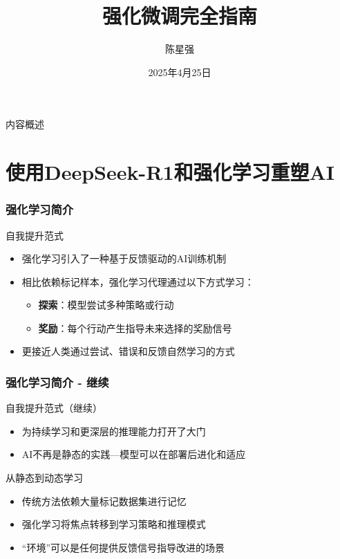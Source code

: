 \documentclass[aspectratio=169]{beamer}
\title[强化微调指南 2025]{强化微调完全指南}
\author{陈星强}
\institute[亿铸智能]{
	亿铸智能
    \\
	中国杭州
}
\date[2025-04-25]{2025年4月25日}
\begin{document}
\begin{frame}
	\maketitle
\end{frame}

\begin{frame}[label=inhalt]{内容概述}
	\tableofcontents
\end{frame}

\section{使用DeepSeek-R1和强化学习重塑AI}

\begin{frame}
	\frametitle{强化学习简介}
	\begin{block}{自我提升范式}
		\begin{itemize}
			\item 强化学习引入了一种基于反馈驱动的AI训练机制
			\item 相比依赖标记样本，强化学习代理通过以下方式学习：
			\begin{itemize}
				\item \textbf{探索}：模型尝试多种策略或行动
				\item \textbf{奖励}：每个行动产生指导未来选择的奖励信号
			\end{itemize}
			\item 更接近人类通过尝试、错误和反馈自然学习的方式
		\end{itemize}
	\end{block}
\end{frame}

\begin{frame}
	\frametitle{强化学习简介 - 继续}
	\begin{block}{自我提升范式（继续）}
		\begin{itemize}
			\item 为持续学习和更深层的推理能力打开了大门
			\item AI不再是静态的实践—模型可以在部署后进化和适应
		\end{itemize}
	\end{block}
	\begin{block}{从静态到动态学习}
		\begin{itemize}
			\item 传统方法依赖大量标记数据集进行记忆
			\item 强化学习将焦点转移到学习策略和推理模式
			\item “环境”可以是任何提供反馈信号指导改进的场景
		\end{itemize}
	\end{block}
\end{frame}
\end{document}
